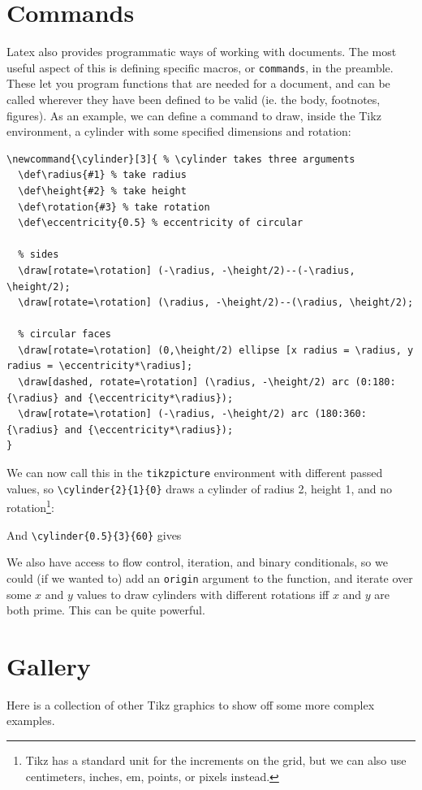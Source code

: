 \documentclass[12pt]{article}
\newcommand{\cylinder}[3]{ %
  \def\radius{#1} %
  \def\height{#2} %
  \def\rotation{#3} %
  \def\eccentricity{0.5} %

  \draw[rotate=\rotation] (-\radius, -\height/2)--(-\radius, \height/2);
  \draw[rotate=\rotation] (\radius, -\height/2)--(\radius, \height/2);

  \draw[rotate=\rotation] (0,\height/2) ellipse [x radius = \radius, y radius = \eccentricity*\radius];
  \draw[dashed, rotate=\rotation] (\radius, -\height/2) arc (0:180:{\radius} and {\eccentricity*\radius});
  \draw[rotate=\rotation] (-\radius, -\height/2) arc (180:360:{\radius} and {\eccentricity*\radius});
}
\begin{document}
\section{Commands}

Latex also provides programmatic ways of working with documents. The most useful aspect of this is defining specific macros, or \texttt{commands}, in the preamble. These let you program functions that are needed for a document, and can be called wherever they have been defined to be valid (ie. the body, footnotes, figures). As an example, we can define a command to draw, inside the Tikz environment, a cylinder with some specified dimensions and rotation:

\begin{verbatim}
\newcommand{\cylinder}[3]{ % \cylinder takes three arguments
  \def\radius{#1} % take radius
  \def\height{#2} % take height
  \def\rotation{#3} % take rotation
  \def\eccentricity{0.5} % eccentricity of circular 

  % sides 
  \draw[rotate=\rotation] (-\radius, -\height/2)--(-\radius, \height/2);
  \draw[rotate=\rotation] (\radius, -\height/2)--(\radius, \height/2);

  % circular faces 
  \draw[rotate=\rotation] (0,\height/2) ellipse [x radius = \radius, y radius = \eccentricity*\radius];
  \draw[dashed, rotate=\rotation] (\radius, -\height/2) arc (0:180:{\radius} and {\eccentricity*\radius});
  \draw[rotate=\rotation] (-\radius, -\height/2) arc (180:360:{\radius} and {\eccentricity*\radius});
}
\end{verbatim}
We can now call this in the \texttt{tikzpicture} environment with different passed values, so \verb|\cylinder{2}{1}{0}| draws a cylinder of radius 2, height 1, and no rotation\footnote{Tikz has a standard unit for the increments on the grid, but we can also use centimeters, inches, em, points, or pixels instead.}:
\begin{center}
\end{center}
And \verb|\cylinder{0.5}{3}{60}| gives
\begin{center}
\end{center}
We also have access to flow control, iteration, and binary conditionals, so we could (if we wanted to) add an \texttt{origin} argument to the function, and iterate over some $x$ and $y$ values to draw cylinders with different rotations iff $x$ and $y$ are both prime. This can be quite powerful.

\section{Gallery}

Here is a collection of other Tikz graphics to show off some more complex examples.
\end{document}
